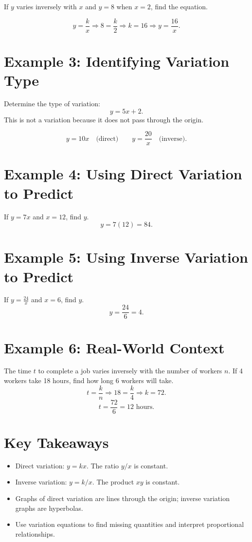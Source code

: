\documentclass[12pt]{article}
\begin{document}
If \(y\) varies inversely with \(x\) and \(y=8\) when \(x=2\), find the equation.

\[
y = \frac{k}{x} \Rightarrow 8 = \frac{k}{2} \Rightarrow k = 16 \Rightarrow \boxed{y = \frac{16}{x}}.
\]

\section*{Example 3: Identifying Variation Type}

Determine the type of variation:
\[
y = 5x + 2.
\]
This is not a variation because it does not pass through the origin.

\[
y = 10x \quad \text{(direct)} \qquad y = \frac{20}{x} \quad \text{(inverse)}.
\]

\section*{Example 4: Using Direct Variation to Predict}

If \(y = 7x\) and \(x=12\), find \(y\).
\[
y = 7(12) = \boxed{84}.
\]

\section*{Example 5: Using Inverse Variation to Predict}

If \(y = \frac{24}{x}\) and \(x=6\), find \(y\).
\[
y = \frac{24}{6} = \boxed{4}.
\]

\section*{Example 6: Real-World Context}

The time \(t\) to complete a job varies inversely with the number of workers \(n\).  
If 4 workers take 18 hours, find how long 6 workers will take.
\[
t = \frac{k}{n} \Rightarrow 18 = \frac{k}{4} \Rightarrow k = 72.
\]
\[
t = \frac{72}{6} = \boxed{12\text{ hours}}.
\]

\section*{Key Takeaways}
\begin{itemize}
  \item Direct variation: \(y = kx\). The ratio \(y/x\) is constant.
  \item Inverse variation: \(y = k/x\). The product \(xy\) is constant.
  \item Graphs of direct variation are lines through the origin; inverse variation graphs are hyperbolas.
  \item Use variation equations to find missing quantities and interpret proportional relationships.
\end{itemize}
\end{document}
